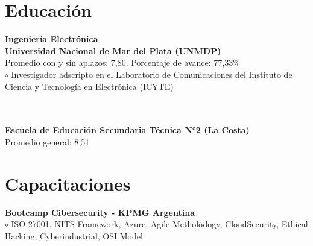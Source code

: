 \documentclass[a4paper,10pt]{article}
\begin{document}
\begin{adjustbox}{valign=t}
\begin{minipage}{0.60\textwidth} %
\section*{Educación}
\begin{description}
\raggedright
\item[	 \textcolor{ColorOne}{2018-2023}] \textbf{Ingeniería Electrónica}\\
	                                      \textbf{Universidad Nacional de Mar del Plata (UNMDP)}\\\Myskip
Promedio con y sin aplazos: 7,80. Porcentaje de avance: 77,33\% \\\Myskip
	     \textcolor{ColorOne}{$\circ$} Investigador adscripto en el Laboratorio de Comunicaciones del Instituto de Ciencia y Tecnología en Electrónica (ICYTE)\\
\\
\item[	 \textcolor{ColorOne}{2011-2017} \textbf{Tecnicatura en Electromecánica -}]\\                                          \textbf{Escuela de Educación Secundaria Técnica N°2 (La Costa)}\\\Myskip
	                                    Promedio general: 8,51 \\\Myskip
\end{description}
\section*{Capacitaciones}
\begin{description}
	\raggedright
	\item[ \textcolor{ColorOne}{Nov.2021}] 
	      \textbf{Bootcamp Cibersecurity - KPMG Argentina}\\ \medskip
     \textcolor{ColorOne}{$\circ$} ISO 27001, NITS Framework, Azure, Agile Metholodogy, CloudSecurity, Ethical Hacking, Cyberindustrial, OSI Model\\	 
\end{description}

\end{minipage}
\end{adjustbox}
\end{document}

